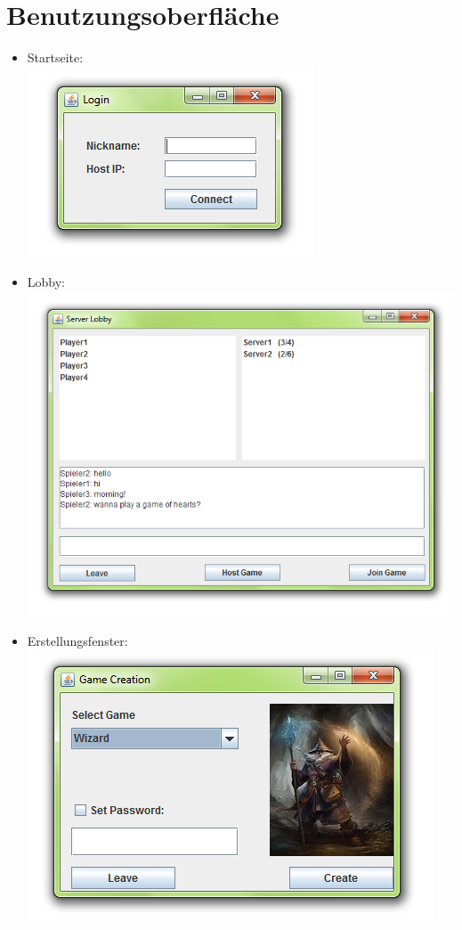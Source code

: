 \documentclass{article}
\begin{document}
\section{Benutzungsoberfläche}
\begin{itemize}
	\item Startseite: \\ \includegraphics{GUI_images/Login}
	\item Lobby: \\ \includegraphics[scale=0.7]{GUI_images/ServerLobby}
	\item \gls{Erstellungsfenster}: \\ 
		\includegraphics[scale=0.8]{GUI_images/CreateGame}

\end{itemize}
\end{document}
